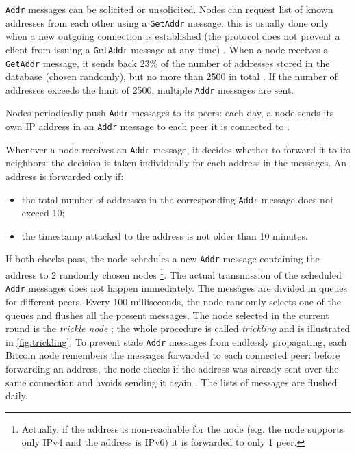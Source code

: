 \texttt{Addr} messages can be solicited or unsolicited.
Nodes can request list of known addresses from each other using a \texttt{GetAddr} message:
this is usually done only when a new outgoing connection is established (the protocol does not prevent a client from issuing a \texttt{GetAddr} message at any time) \cite{eclipse_attack_2015}.
When a node receives a \texttt{GetAddr} message, it sends back \num{23}\% of the number of addresses stored in the database (chosen randomly), but no more than \num{2500} in total \cite{deanonymisation_2014}.
If the number of addresses exceeds the limit of \num{2500}, multiple \texttt{Addr} messages are sent.

Nodes periodically push \texttt{Addr} messages to its peers:
each day, a node sends its own IP address in an \texttt{Addr} message to each peer it is connected to \cite{eclipse_attack_2015}.

Whenever a node receives an \texttt{Addr} message, it decides whether to forward it to its neighbors;
the decision is taken individually for each address in the messages.
An address is forwarded only if:
\begin{itemize}
	\item the total number of addresses in the corresponding \texttt{Addr} message does not exceed \num{10};
	\item the timestamp attacked to the address is not older than \num{10} minutes.
\end{itemize}
If both checks pass, the node schedules a new \texttt{Addr} message containing the address to \num{2} randomly chosen nodes \footnote{Actually, if the address is non-reachable for the node (e.g. the node supports only IPv4 and the address is IPv6) it is forwarded to only \num{1} peer.}.
The actual transmission of the scheduled \texttt{Addr} messages does not happen immediately.
The messages are divided in queues for different peers.
Every \num{100} milliseconds, the node randomly selects one of the queues and flushes all the present messages.
The node selected in the current round is the \textit{trickle node} \cite{deanonymisation_2014}; the whole procedure is called \textit{trickling} and is illustrated in \cref{fig:trickling}.
To prevent stale \texttt{Addr} messages from endlessly propagating, each Bitcoin node remembers the messages forwarded to each connected peer:
before forwarding an address, the node checks if the address was already sent over the same connection and avoids sending it again \cite{eclipse_attack_2015}.
The lists of messages are flushed daily.

